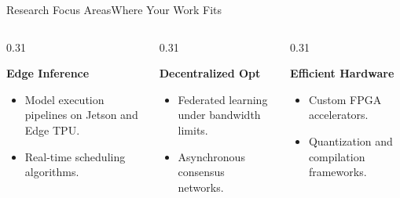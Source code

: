 \begin{frame}{Research Focus Areas}{Where Your Work Fits}
  \begin{columns}[T]
    \begin{column}{0.31\textwidth}
      \begin{accentbox}[height=5.2cm]
        \centering
        {\color{accent}\Large\faServer\par}
        \vspace{0.2cm}
        \textbf{Edge Inference}
        \vspace{0.2cm}
        \begin{itemize}
          \item Model execution pipelines on Jetson and Edge TPU.
          \item Real-time scheduling algorithms.
        \end{itemize}
      \end{accentbox}
    \end{column}
    
    \begin{column}{0.31\textwidth}
      \begin{accentbox}[height=5.2cm]
        \centering
        {\color{accent}\Large\faNetworkWired\par}
        \vspace{0.2cm}
        \textbf{Decentralized Opt}
        \vspace{0.2cm}
        \begin{itemize}
          \item Federated learning under bandwidth limits.
          \item Asynchronous consensus networks.
        \end{itemize}
      \end{accentbox}
    \end{column}
    
    \begin{column}{0.31\textwidth}
      \begin{accentbox}[height=5.2cm]
        \centering
        {\color{accent}\Large\faMicrochip\par}
        \vspace{0.2cm}
        \textbf{Efficient Hardware}
        \vspace{0.2cm}
        \begin{itemize}
          \item Custom FPGA accelerators.
          \item Quantization and compilation frameworks.
        \end{itemize}
      \end{accentbox}
    \end{column}
  \end{columns}
\end{frame}
